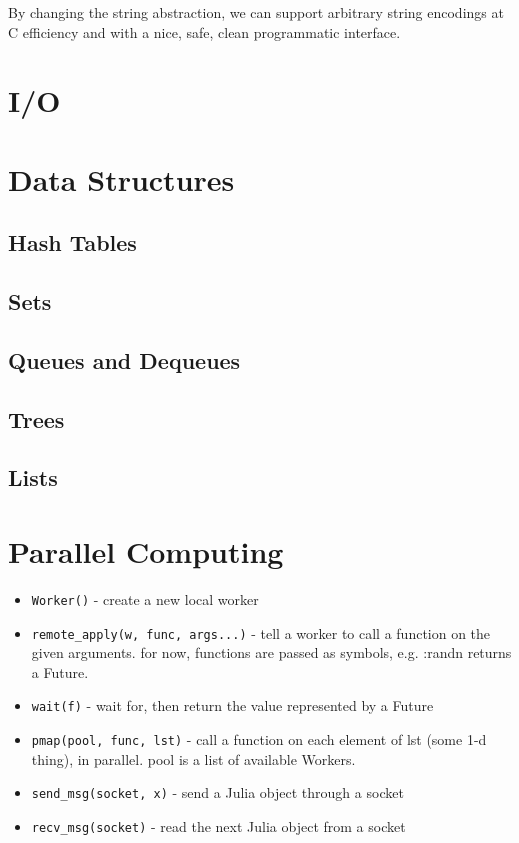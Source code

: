 \documentclass{article}
\begin{document}
By changing the string abstraction, we can support arbitrary string encodings at C efficiency and with a nice, safe, clean programmatic interface.

\section{I/O}
\section{Data Structures}
\subsection{Hash Tables}
\subsection{Sets}
\subsection{Queues and Dequeues}
\subsection{Trees}
\subsection{Lists}

\section{Parallel Computing}
\begin{itemize}
  \item {\tt Worker()} - create a new local worker

  \item {\tt remote\_apply(w, func, args...)} -
     tell a worker to call a function on the given arguments.
     for now, functions are passed as symbols, e.g. :randn
     returns a Future.

   \item {\tt wait(f)} - wait for, then return the value represented by a Future

   \item {\tt pmap(pool, func, lst)} -
     call a function on each element of lst (some 1-d thing), in
     parallel. pool is a list of available Workers.

   \item {\tt send\_msg(socket, x)} - send a Julia object through a socket

   \item {\tt recv\_msg(socket)} - read the next Julia object from a socket
\end{itemize}
\end{document}
